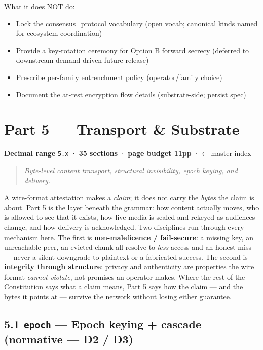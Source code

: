 \documentclass[11pt]{article}
\begin{document}
What it does NOT do:

\begin{itemize}\setlength\itemsep{0pt}
\item Lock the consensus\_protocol vocabulary (open vocab; canonical kinds named for ecosystem coordination)
\item Provide a key-rotation ceremony for Option B forward secrecy (deferred to downstream-demand-driven future release)
\item Prescribe per-family entrenchment policy (operator/family choice)
\item Document the at-rest encryption flow details (substrate-side; persist spec)
\end{itemize}


\clearpage
\section*{Part 5 — Transport \& Substrate}


\textbf{Decimal range} \texttt{5.x} · \textbf{35 sections} · \textbf{page budget 11pp} · ← master index


\begin{quote}\itshape Byte-level content transport, structural invisibility, epoch keying, and delivery.\end{quote}



A wire-format attestation makes a \textit{claim}; it does not carry the \textit{bytes} the claim is about. Part 5 is the layer beneath the grammar: how content actually moves, who is allowed to see that it exists, how live media is sealed and rekeyed as audiences change, and how delivery is acknowledged. Two disciplines run through every mechanism here. The first is \textbf{non-maleficence / fail-secure}: a missing key, an unreachable peer, an evicted chunk all resolve to \textit{less} access and an honest miss — never a silent downgrade to plaintext or a fabricated success. The second is \textbf{integrity through structure}: privacy and authenticity are properties the wire format \textit{cannot violate}, not promises an operator makes. Where the rest of the Constitution says what a claim means, Part 5 says how the claim — and the bytes it points at — survive the network without losing either guarantee.


\subsection*{5.1 \texttt{epoch} — Epoch keying + cascade (normative — D2 / D3)}
\end{document}
